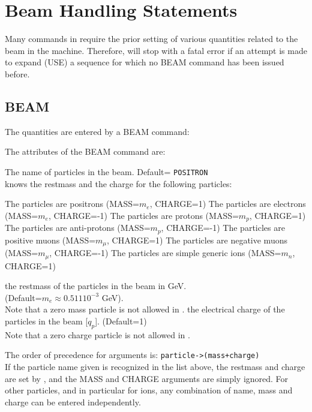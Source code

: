 \chapter{Beam Handling Statements} 
\label{chap:beam}

Many commands in \mad require the prior setting of various quantities related
to the beam in the machine. Therefore, \mad will stop with a fatal
error if an attempt is made to expand (USE) a sequence for which no BEAM
command has been issued before.  



\section{BEAM}
\label{sec:beam}

The quantities are entered by a BEAM command: 

The attributes of the BEAM command are: 
\begin{madlist}
   The name of particles in the beam. Default= {\tt POSITRON}\\
  \mad knows the restmass and the charge for the following particles:
  \begin{madlist}
     The particles are positrons (MASS=$m_e$, CHARGE=1)
     The particles are electrons (MASS=$m_e$, CHARGE=-1) 
     The particles are protons (MASS=$m_p$, CHARGE=1)
     The particles are anti-protons (MASS=$m_p$, CHARGE=-1) 
     The particles are positive muons (MASS=$m_{\mu}$, CHARGE=1) 
     The particles are negative muons (MASS=$m_{\mu}$, CHARGE=-1) 
     The particles are simple generic ions (MASS=$m_n$, CHARGE=1)
  \end{madlist}
   the restmass of the particles in the beam in GeV. \\
  (Default=$m_e \approx 0.511 10^{-3}$ GeV).\\
  Note that a zero mass particle is not allowed in \mad.
  \label{beam_charge} the electrical charge of the
  particles in the beam [$q_p$]. (Default=1) \\
  Note that a zero charge particle is not allowed in \mad.
\end{madlist} 
The order of precedence for arguments is:  {\tt particle->(mass+charge)}\\ 
If the particle name given is recognized in the list above, the restmass
and charge are set by \mad, and the MASS and CHARGE arguments are
simply ignored. For other particles, and in particular for ions, any
combination of name, mass and charge can be entered independently.
\\

